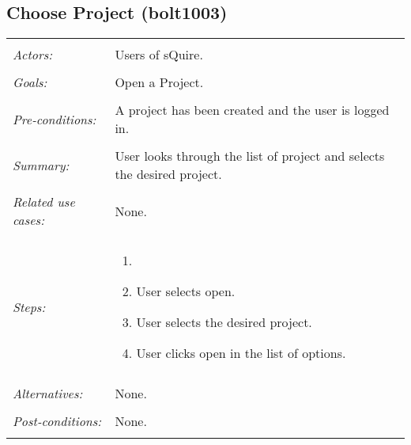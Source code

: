 \subsection{Choose Project (bolt1003)}
\begin{tabular}{ p{2cm} p{12cm} }
 \hline
 \\
 \textit{Actors:} & Users of sQuire. \\ 
 \\
 \textit{Goals:} & Open a Project. \\
 \\
 \textit{Pre-conditions:} & A project has been created and the user is logged in. \\
 \\
 \textit{Summary:} & User looks through the list of project and selects the desired project. \\ 
 \\
 \textit{Related use cases:} & None. \\ 
 \\
 \textit{Steps:} & \begin{enumerate}
  \item 
  \item User selects open.
  \item User selects the desired project.
  \item User clicks open in the list of options.
 \end{enumerate} \\
 \\
 \textit{Alternatives:} & None. \\
 \\
 \textit{Post-conditions:} & None. \\
 \\
\hline
\end{tabular}

